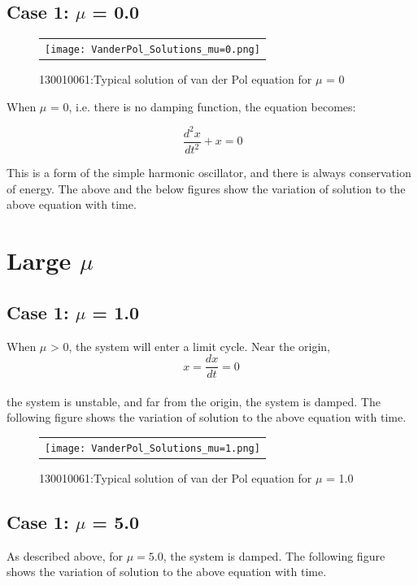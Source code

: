 \documentclass[12pt, a4paper]{report}
\begin{document}
\subsection{Case 1: $\mu$ = 0.0}


\begin{figure}[H]
	\centering
	\begin{tabular} {l}
	\texttt{[image: VanderPol\_Solutions\_mu=0.png]} 
	\end{tabular}
	\caption{130010061:Typical solution of van der Pol equation for $\mu$ = 0}
\end{figure}
\label{fig2} 

When $\mu$ = 0, i.e. there is no damping function, the equation becomes: 

\begin{equation}\
\frac{d^2 x}{dt^2}+x=0
\end{equation}

This is a form of the simple harmonic oscillator, and there is always conservation of energy.
The above and the below figures show the variation of solution to the above equation with time.



\section{Large $\mu$}
\subsection{Case 1: $\mu$ = 1.0}
When $\mu$ > 0, the system will enter a limit cycle. Near the origin, 
\begin{equation}
x = \frac{dx}{dt} = 0
\end{equation}\\

the system is unstable, and far from the origin, the system is damped.
The following figure shows the variation of solution to the above equation with time.

\begin{figure}[H]
	\centering
	\begin{tabular} {l}
	\texttt{[image: VanderPol\_Solutions\_mu=1.png]} 
	\end{tabular}
	\caption{130010061:Typical solution of van der Pol equation for $\mu$ = 1.0}
\end{figure}
\label{fig3} 

\subsection{Case 1: $\mu$ = 5.0}
As described above, for $\mu=5.0$, the system is damped.
The following figure shows the variation of solution to the above equation with time.
\end{document}
